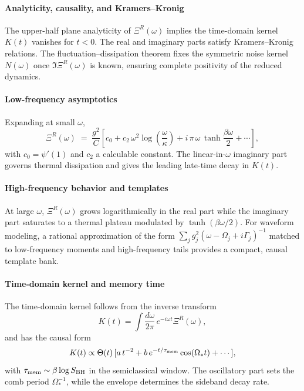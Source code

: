 \documentclass[a4paper,11pt]{article}
\theoremstyle{plain}
\theoremstyle{definition}
\theoremstyle{remark}
\begin{document}
\paragraph{Analyticity, causality, and Kramers--Kronig}
The upper-half plane analyticity of $\Xi^R(\omega)$ implies the time-domain kernel $K(t)$ vanishes for $t<0$. The real and imaginary parts satisfy Kramers--Kronig relations. The fluctuation--dissipation theorem fixes the symmetric noise kernel $N(\omega)$ once $\Im \Xi^R(\omega)$ is known, ensuring complete positivity of the reduced dynamics.

\paragraph{Low-frequency asymptotics}
Expanding at small $\omega$,
\begin{equation}
\Xi^R(\omega)\;=\;\frac{g^2}{C}\left[c_0 + c_2\,\omega^2\log\!\left(\frac{\omega}{\kappa}\right)+ i\,\pi\,\omega\,\tanh\!\frac{\beta\omega}{2}+\cdots\right],
\end{equation}
with $c_0=\psi'(1)$ and $c_2$ a calculable constant. The linear-in-$\omega$ imaginary part governs thermal dissipation and gives the leading late-time decay in $K(t)$.

\paragraph{High-frequency behavior and templates}
At large $\omega$, $\Xi^R(\omega)$ grows logarithmically in the real part while the imaginary part saturates to a thermal plateau modulated by $\tanh(\beta\omega/2)$. For waveform modeling, a rational approximation of the form $\sum_j g_j^2(\omega-\Omega_j+i\Gamma_j)^{-1}$ matched to low-frequency moments and high-frequency tails provides a compact, causal template bank.

\paragraph{Time-domain kernel and memory time}
The time-domain kernel follows from the inverse transform
\[
K(t)=\int \frac{d\omega}{2\pi}\,e^{-i\omega t}\Xi^R(\omega),
\]
and has the causal form
\[
K(t)\propto \Theta(t)\,[a\,t^{-2}+b\,e^{-t/\tau_{\rm mem}}\cos(\Omega_\ast t)+\cdots],
\]
with $\tau_{\rm mem}\sim \beta\log S_{\rm BH}$ in the semiclassical window. The oscillatory part sets the comb period $\Omega_\ast^{-1}$, while the envelope determines the sideband decay rate.
\end{document}
